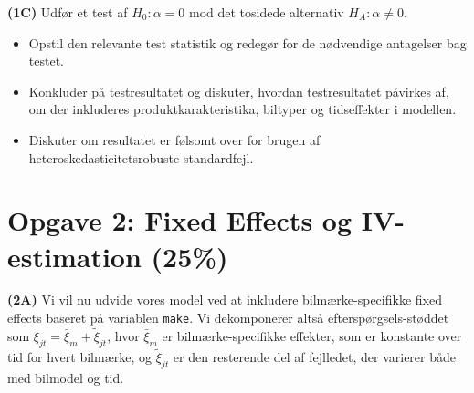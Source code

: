 \documentclass[a4paper,12pt]{article}
\begin{document}
\noindent \textbf{(1C)}
Udfør et test af $H_{0}:\alpha=0$ mod det tosidede alternativ $H_{A}:\alpha\neq0$. 
\begin{itemize}
    \item Opstil den relevante test statistik og redegør for de nødvendige antagelser bag testet.
    \item Konkluder på testresultatet og diskuter, hvordan testresultatet påvirkes af, om der inkluderes produktkarakteristika, biltyper og tidseffekter i modellen.
    \item Diskuter om resultatet er følsomt over for brugen af heteroskedasticitetsrobuste standardfejl.
\end{itemize}

\bigskip
\section*{Opgave 2: Fixed Effects og IV-estimation (25\%)}
\noindent \textbf{(2A)} Vi vil nu udvide vores model ved at inkludere bilmærke-specifikke fixed effects baseret på variablen \texttt{make}. Vi dekomponerer altså efterspørgsels-støddet som \( \xi_{jt} = \bar{\xi}_m + \tilde{\xi}_{jt} \), hvor \( \bar{\xi}_m \) er bilmærke-specifikke effekter, som er konstante over tid for hvert bilmærke, og \( \tilde{\xi}_{jt} \) er den resterende del af fejlledet, der varierer både med bilmodel og tid.
\end{document}
